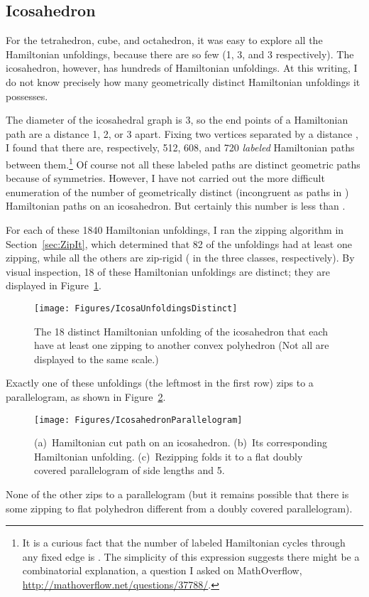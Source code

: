 \pdfoutput=1  \documentclass[]{article}
\newcommand{\figlab}[1]{\label{fig:#1}}
\newcommand{\secref}[1]{\ref{sec:#1}}
\newcommand{\figref}[1]{\ref{fig:#1}}
\begin{document}
\subsection{Icosahedron}
For the tetrahedron, cube, and octahedron, it was easy to explore
all the Hamiltonian unfoldings, because there are so few (1, 3, and 3
respectively).
The icosahedron, however, has hundreds of Hamiltonian unfoldings.
At this writing, I do not know precisely how many geometrically
distinct Hamiltonian unfoldings it possesses.

The diameter of the icosahedral graph is 3, so the end points of a
Hamiltonian path are a distance 1, 2, or 3 apart.
Fixing two vertices separated by a distance ,
I found that there are, respectively,
512, 608, and 720 \emph{labeled} Hamiltonian paths between them.\footnote{
  It is a curious fact that the number of labeled Hamiltonian cycles
  through any fixed edge is .
  The simplicity of this expression suggests there might be 
  a combinatorial explanation,
  a question I asked on MathOverflow,
  \url{http://mathoverflow.net/questions/37788/}.
}
Of course not all these labeled paths are distinct geometric paths
because of symmetries.
However, I have not carried out the more difficult enumeration of the 
number of geometrically distinct (incongruent as paths in )
Hamiltonian paths on an icosahedron.
But certainly this number is less than .

For each of these 1840 Hamiltonian unfoldings, I ran the zipping
algorithm
in Section~\secref{ZipIt}, which determined that 82 of the unfoldings
had at least one zipping, while all the others are zip-rigid
( in the three classes, respectively).
By visual inspection, 18 of these Hamiltonian
unfoldings
are distinct; they are displayed in 
Figure~\figref{IcosaUnfoldingsDistinct}.
\begin{figure}[htbp]
\centering
\texttt{[image: Figures/IcosaUnfoldingsDistinct]}
\caption{The 18 distinct Hamiltonian unfolding of the icosahedron that
each have at least one zipping to another convex polyhedron
(Not all are displayed to the same scale.)}
\figlab{IcosaUnfoldingsDistinct}
\end{figure}


Exactly one of these unfoldings (the leftmost
in the first row) zips to a parallelogram, as 
shown in 
Figure~\figref{IcosahedronParallelogram}.
\begin{figure}[htbp]
\centering
\texttt{[image: Figures/IcosahedronParallelogram]}
\caption{(a)~Hamiltonian cut path on an icosahedron.
(b)~Its corresponding Hamiltonian unfolding.
(c)~Rezipping folds it to
a flat doubly covered parallelogram
of side lengths  and 5.}
\figlab{IcosahedronParallelogram}
\end{figure}
None of the other zips to a parallelogram 
(but it remains
possible that there is some zipping to flat polyhedron different
from a doubly covered parallelogram).
\end{document}
